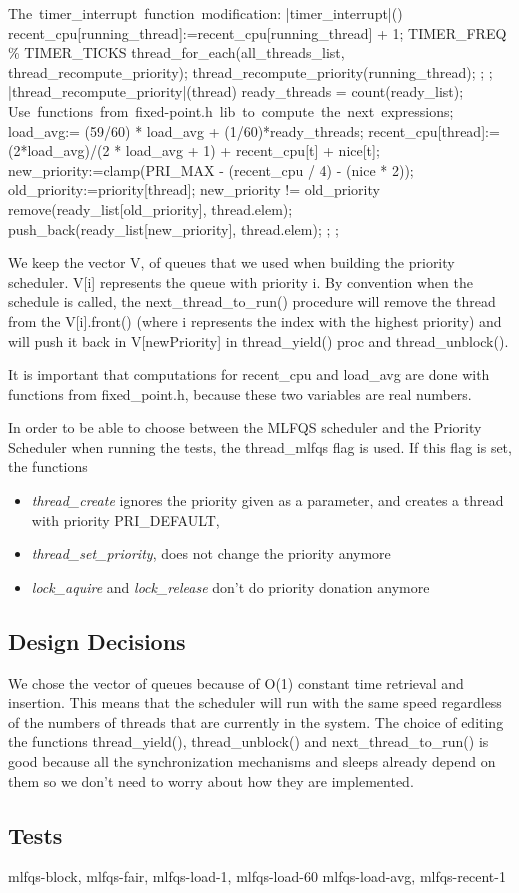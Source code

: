 	\begin{program}
	\mbox{The timer\_interrupt function modification:}     
	\PROC |timer\_interrupt|() \BODY
		recent\_cpu[running\_thread]:=recent\_cpu[running\_thread] + 1;
		\IF TIMER\_FREQ \% TIMER\_TICKS  
		      \THEN thread\_for\_each(all\_threads\_list, thread\_recompute\_priority); 
		      \ELSE thread\_recompute\_priority(running\_thread);
		\FI;
	\END;
	\PROC |thread\_recompute\_priority|(thread) \BODY
		ready\_threads = count(ready\_list);
		\mbox{Use functions from fixed-point.h lib to compute the next expressions};
		load\_avg:= (59/60) * load\_avg + (1/60)*ready_threads; 
		recent\_cpu[thread]:= (2*load\_avg)/(2 * load\_avg + 1) + recent\_cpu[t] + nice[t];
		new\_priority:=clamp(PRI\_MAX - (recent\_cpu / 4) - (nice * 2));
		old\_priority:=priority[thread];
		\IF new\_priority != old\_priority
		      \THEN remove(ready\_list[old\_priority], thread.elem);
			    push\_back(ready\_list[new\_priority], thread.elem);
		\FI;
	\END;
	\end{program}
	We keep the vector V, of queues that we used when building the priority scheduler. V[i] represents the queue with priority i. By convention when the schedule is called, the next\_thread\_to\_run() procedure will remove the thread from the V[i].front() (where i represents the index with the highest priority) and will push it back in V[newPriority] in thread\_yield() proc and thread\_unblock().

	It is important that computations for recent\_cpu and load\_avg are done with functions from fixed\_point.h, because these two variables are real numbers.

	In order to be able to choose between the MLFQS scheduler and the Priority Scheduler when running the tests, the thread\_mlfqs flag is used. If this flag is set, the functions 
	\begin{itemize}
	  \item \textit{thread\_create} ignores the priority given as a parameter, and creates a thread with priority PRI\_DEFAULT,
	  \item \textit{thread\_set\_priority}, does not change the priority anymore
	  \item \textit{lock\_aquire} and \textit{lock\_release} don't do priority donation anymore
	\end{itemize}

    \subsection{Design Decisions}
We chose the vector of queues because of O(1) constant time retrieval and insertion. This means that the scheduler will run with the same speed regardless of the numbers of threads that are currently in the system. The choice of editing the functions thread\_yield(), thread\_unblock() and next\_thread\_to\_run() is good because all the synchronization mechanisms and sleeps already depend on them so we don't need to worry about how they are implemented.

    \subsection{Tests}
	mlfqs-block, mlfqs-fair, mlfqs-load-1, mlfqs-load-60 mlfqs-load-avg, mlfqs-recent-1